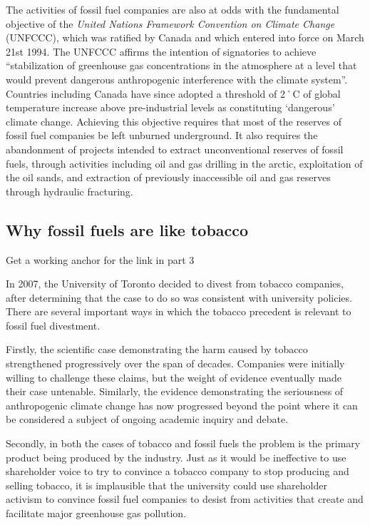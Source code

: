 The activities of fossil fuel companies are also at odds with the fundamental objective of the \emph{United Nations Framework Convention on Climate Change} (UNFCCC), which was ratified by Canada and which entered into force on March 21st 1994.
The UNFCCC affirms the intention of signatories to achieve ``stabilization of greenhouse gas concentrations in the atmosphere at a level that would prevent dangerous anthropogenic interference with the climate system''.
Countries including Canada have since adopted a threshold of 2˚C of global temperature increase above pre-industrial levels as constituting `dangerous' climate change.
Achieving this objective requires that most of the reserves of fossil fuel companies be left unburned underground.
It also requires the abandonment of projects intended to extract unconventional reserves of fossil fuels, through activities including oil and gas drilling in the arctic, exploitation of the oil sands, and extraction of previously inaccessible oil and gas reserves through hydraulic fracturing.



	\subsection{Why fossil fuels are like tobacco}
	\label{LikeTobacco}

\begin{vcom}
		Get a working anchor for the link in part 3
\end{vcom}




In 2007, the University of Toronto decided to divest from tobacco companies, after determining that the case to do so was consistent with university policies.
There are several important ways in which the tobacco precedent is relevant to fossil fuel divestment.



Firstly, the scientific case demonstrating the harm caused by tobacco strengthened progressively over the span of decades.
Companies were initially willing to challenge these claims, but the weight of evidence eventually made their case untenable.
Similarly, the evidence demonstrating the seriousness of anthropogenic climate change has now progressed beyond the point where it can be considered a subject of ongoing academic inquiry and debate.


Secondly, in both the cases of tobacco and fossil fuels the problem is the primary product being produced by the industry.
Just as it would be ineffective to use shareholder voice to try to convince a tobacco company to stop producing and selling tobacco, it is implausible that the university could use shareholder activism to convince fossil fuel companies to desist from activities that create and facilitate major greenhouse gas pollution.



